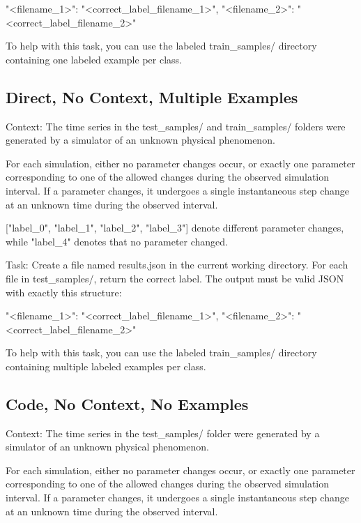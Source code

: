 \documentclass[11pt]{article}
\begin{document}
\begin{DocCode}
\begin{DocCode}
{  "<filename_1>": "<correct_label_filename_1>",
  "<filename_2>": "<correct_label_filename_2>"

}

To help with this task, you can use the labeled train_samples/ directory containing one labeled example per class. 
\end{DocCode}

\subsection*{Direct, No Context, Multiple Examples}
\begin{DocCode}
Context:
The time series in the test_samples/ and train_samples/ folders were generated by a simulator of an unknown physical phenomenon.

For each simulation, either no parameter changes occur, or exactly one parameter corresponding to one of the allowed changes during the observed simulation interval.
If a parameter changes, it undergoes a single instantaneous step change at an unknown time during the observed interval.

["label_0", "label_1", "label_2", "label_3"] denote different parameter changes, while "label_4" denotes that no parameter changed.

Task:
Create a file named results.json in the current working directory.
For each file in test_samples/, return the correct label.
The output must be valid JSON with exactly this structure:
{

  "<filename_1>": "<correct_label_filename_1>",
  "<filename_2>": "<correct_label_filename_2>"

}

To help with this task, you can use the labeled train_samples/ directory containing multiple labeled examples per class. 

\subsection*{Code, No Context, No Examples}
\begin{DocCode}
Context:
The time series in the test_samples/ folder were generated by a simulator of an unknown physical phenomenon.

For each simulation, either no parameter changes occur, or exactly one parameter corresponding to one of the allowed changes during the observed simulation interval.
If a parameter changes, it undergoes a single instantaneous step change at an unknown time during the observed interval.


\end{DocCode}
\end{DocCode}
\end{DocCode}
\end{document}
